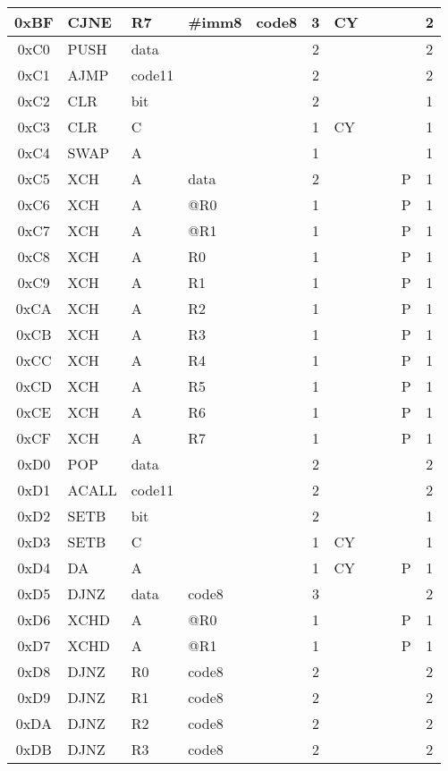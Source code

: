 \documentclass[a4paper,twoside,12pt]{book}
\begin{document}
{\begin{longtable}{|c|l|lll|c|llll|c|}
		0xBF	& CJNE	& R7	& \#imm8& code8	& 3	& CY	&	&	&	& 2	\\\hline
		0xC0	& PUSH	& data	&	&	& 2	&	&	&	&	& 2	\\\hline
		0xC1	& AJMP	& code11&	&	& 2	&	&	&	&	& 2	\\\hline
		0xC2	& CLR	& bit	&	&	& 2	&	&	&	&	& 1	\\\hline
		0xC3	& CLR	& C	&	&	& 1	& CY	&	&	&	& 1	\\\hline
		0xC4	& SWAP	& A	&	&	& 1	&	&	&	&	& 1	\\\hline
		0xC5	& XCH	& A	& data	&	& 2	&	&	&	& P	& 1	\\\hline
		0xC6	& XCH	& A	& @R0	&	& 1	&	&	&	& P	& 1	\\\hline
		0xC7	& XCH	& A	& @R1	&	& 1	&	&	&	& P	& 1	\\\hline
		0xC8	& XCH	& A	& R0	&	& 1	&	&	&	& P	& 1	\\\hline
		0xC9	& XCH	& A	& R1	&	& 1	&	&	&	& P	& 1	\\\hline
		0xCA	& XCH	& A	& R2	&	& 1	&	&	&	& P	& 1	\\\hline
		0xCB	& XCH	& A	& R3	&	& 1	&	&	&	& P	& 1	\\\hline
		0xCC	& XCH	& A	& R4	&	& 1	&	&	&	& P	& 1	\\\hline
		0xCD	& XCH	& A	& R5	&	& 1	&	&	&	& P	& 1	\\\hline
		0xCE	& XCH	& A	& R6	&	& 1	&	&	&	& P	& 1	\\\hline
		0xCF	& XCH	& A	& R7	&	& 1	&	&	&	& P	& 1	\\\hline
		0xD0	& POP	& data	&	&	& 2	&	&	&	&	& 2	\\\hline
		0xD1	& ACALL	& code11&	&	& 2	&	&	&	&	& 2	\\\hline
		0xD2	& SETB	& bit	&	&	& 2	&	&	&	&	& 1	\\\hline
		0xD3	& SETB	& C	&	&	& 1	& CY	&	&	&	& 1	\\\hline
		0xD4	& DA	& A	&	&	& 1	& CY	&	&	& P	& 1	\\\hline
		0xD5	& DJNZ	& data	& code8	&	& 3	&	&	&	&	& 2	\\\hline
		0xD6	& XCHD	& A	& @R0	&	& 1	&	&	&	& P	& 1	\\\hline
		0xD7	& XCHD	& A	& @R1	&	& 1	&	&	&	& P	& 1	\\\hline
		0xD8	& DJNZ	& R0	& code8	&	& 2	&	&	&	&	& 2	\\\hline
		0xD9	& DJNZ	& R1	& code8	&	& 2	&	&	&	&	& 2	\\\hline
		0xDA	& DJNZ	& R2	& code8	&	& 2	&	&	&	&	& 2	\\\hline
		0xDB	& DJNZ	& R3	& code8	&	& 2	&	&	&	&	& 2	\\\hline

\end{longtable}}
\end{document}
